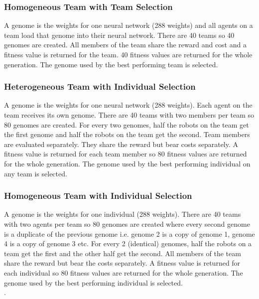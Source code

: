 \documentclass[12pt]{article}  %
\begin{document}
\subsubsection{Homogeneous Team with Team Selection}

A genome is the weights for one neural network (288 weights) and all agents on a team load that genome into their neural network.
There are 40 teams so 40 genomes are created. 
All members of the team share the reward and cost and a fitness value is returned for the team.
40 fitness values are returned for the whole generation. 
The genome used by the best performing team is selected.\\

\subsubsection{Heterogeneous Team with Individual Selection}

A genome is the weights for one neural network (288 weights).
Each agent on the team receives its own genome.
There are 40 teams with two members per team so 80 genomes are created.  
For every two genomes, half the robots on the team get the first genome and half the robots on the team get the second. 
Team members are evaluated separately. 
They share the reward but bear costs separately. 
A fitness value is returned for each team member so 80 fitness values are returned for the whole generation. 
The genome used by the best performing individual on any team is selected. \\

\subsubsection{Homogeneous Team with Individual Selection}

A genome is the weights for one individual (288 weights). 
There are 40 teams with two agents per team so 80 genomes are created where every second genome is a duplicate of the previous genome i.e. genome 2 is a copy of genome 1, genome 4 is a copy of genome 3 etc. 
For every 2 (identical) genomes, half the robots on a team get the first and the other half get the second. 
All members of the team share the reward but bear the costs separately. 
A fitness value is returned for each individual so 80 fitness values are returned for the whole generation. 
The genome used by the best performing individual is selected.\\. 
\end{document}
